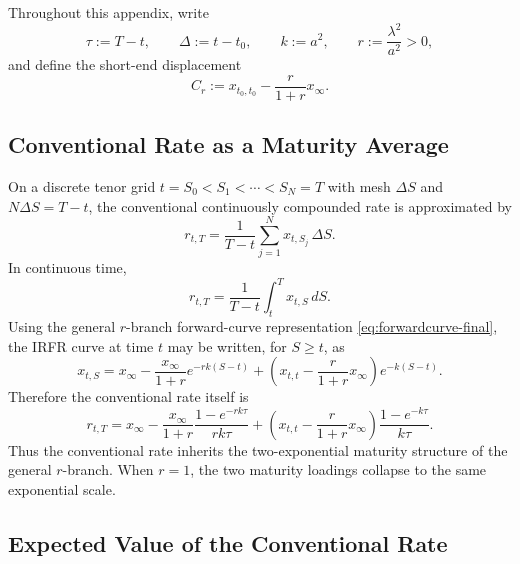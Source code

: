 \documentclass[12pt]{article}
\theoremstyle{statementstyle}
\begin{document}
\begin{appendices}
Throughout this appendix, write
\[
\tau:=T-t,
\qquad
\Delta:=t-t_{0},
\qquad
k:=a^{2},
\qquad
r:=\frac{\lambda^{2}}{a^{2}}>0,
\]
and define the short-end displacement
\begin{equation}
C_{r}:=x_{t_{0},t_{0}}-\frac{r}{1+r}x_{\infty}.
\tag{C.0.1}\label{eq:Cr-conventional}
\end{equation}

\subsection{Conventional Rate as a Maturity Average}
\label{appendix:C0}

On a discrete tenor grid $t=S_0<S_1<\cdots<S_N=T$ with mesh $\Delta S$
and $N\Delta S=T-t$, the conventional continuously compounded rate is
approximated by
\[
r_{t,T}
=
\frac{1}{T-t}
\sum_{j=1}^{N}x_{t,S_j}\,\Delta S.
\]
In continuous time,
\begin{equation}
r_{t,T}
=
\frac{1}{T-t}\int_t^T x_{t,S}\,dS.
\tag{C.1.1}\label{eq:conventional-average}
\end{equation}
Using the general $r$-branch forward-curve representation
\eqref{eq:forwardcurve-final}, the IRFR curve at time $t$ may be written,
for $S\ge t$, as
\begin{equation}
x_{t,S}
=
x_{\infty}
-
\frac{x_{\infty}}{1+r}e^{-rk(S-t)}
+
\left(x_{t,t}-\frac{r}{1+r}x_{\infty}\right)e^{-k(S-t)}.
\tag{C.1.2}\label{eq:irfr-curve-for-conventional}
\end{equation}
Therefore the conventional rate itself is
\begin{equation}
r_{t,T}
=
x_{\infty}
-
\frac{x_{\infty}}{1+r}
\frac{1-e^{-rk\tau}}{rk\tau}
+
\left(x_{t,t}-\frac{r}{1+r}x_{\infty}\right)
\frac{1-e^{-k\tau}}{k\tau}.
\tag{C.1.3}\label{eq:conventional-rate-general-r}
\end{equation}
Thus the conventional rate inherits the two-exponential maturity structure
of the general $r$-branch. When $r=1$, the two maturity loadings collapse
to the same exponential scale.

\subsection{Expected Value of the Conventional Rate}
\label{appendix:C1}


\end{appendices}
\end{document}
